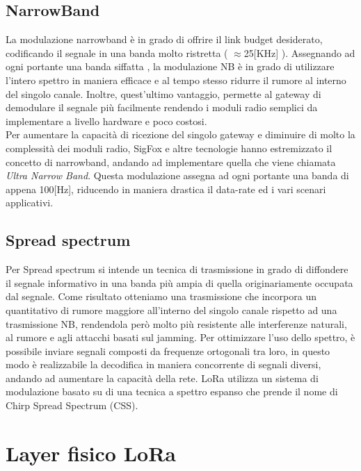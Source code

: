 \subsection{NarrowBand}
La modulazione narrowband è in grado di offrire il link budget desiderato,
codificando il segnale in una banda molto ristretta ( $\approx$25[KHz]
).  Assegnando ad ogni  portante una banda siffatta , la modulazione NB è in
grado di utilizzare l'intero spettro in maniera efficace e al tempo stesso 
ridurre il rumore al interno del singolo canale. Inoltre, quest'ultimo 
vantaggio, permette al gateway di demodulare il segnale più facilmente rendendo
i moduli radio semplici da implementare a livello hardware e poco costosi.\\
Per aumentare la capacità di ricezione
del  singolo gateway  e diminuire di molto la  complessità dei moduli radio,
SigFox e altre tecnologie hanno estremizzato il concetto di narrowband, andando ad
implementare quella che viene chiamata \emph{Ultra Narrow Band}.
Questa modulazione assegna ad ogni portante una banda di appena 100[Hz],
riducendo in maniera drastica il data-rate ed  i vari scenari applicativi. 

\subsection{Spread spectrum} 
Per  Spread spectrum si intende un tecnica di trasmissione
in grado di diffondere il segnale informativo in una banda più ampia di quella
originariamente occupata dal segnale. Come risultato otteniamo una trasmissione 
che incorpora un quantitativo di  rumore maggiore all'interno del singolo canale
rispetto ad una trasmissione NB,
rendendola però molto più resistente alle interferenze
naturali, al rumore e agli attacchi basati sul jamming.
Per ottimizzare l'uso dello spettro, è possibile inviare segnali composti da  
frequenze ortogonali tra loro, in questo modo è realizzabile la decodifica in maniera
concorrente di segnali diversi, andando ad aumentare la capacità della rete.
LoRa utilizza un sistema di modulazione basato su di una tecnica  a 
spettro espanso che prende il nome di Chirp Spread Spectrum (CSS).
\section{Layer fisico LoRa}
